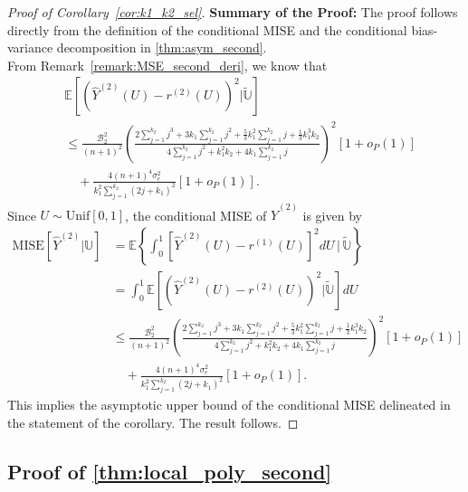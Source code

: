 \documentclass{uwstat572}
\theoremstyle{definition}
\renewcommand{\hat}{\widehat}
\renewcommand{\tilde}{\widetilde}
\theoremstyle{theorem}
\begin{document}
\begin{proof}[Proof of Corollary~\ref{cor:k1_k2_sel}]
{\bf Summary of the Proof:} The proof follows directly from the definition of the conditional MISE and the conditional bias-variance decomposition in \autoref{thm:asym_second}.\\

From Remark~\ref{remark:MSE_second_deri}, we know that
\begin{align*}
&\mathbb{E}\left[\left(\hat{Y}^{(2)}(U) - r^{(2)}(U)\right)^2 \Big| \tilde{\mathbb{U}}\right] \\
&\leq \frac{\mathcal{B}_2^2}{(n+1)^2}  \left(\frac{2\sum_{j=1}^{k_2} j^3 + 3k_1 \sum_{j=1}^{k_2} j^2 + \frac{5}{3} k_1^2 \sum_{j=1}^{k_2}j + \frac{1}{3} k_1^3k_2}{4 \sum_{j=1}^{k_2}j^2 + k_1^2k_2 + 4k_1\sum_{j=1}^{k_2} j} \right)^2 \left[1+o_P(1)\right]\\
&\quad + \frac{4(n+1)^4 \sigma_e^2}{k_1^2 \sum_{j=1}^{k_2} (2j+k_1)^2} \left[1+o_P(1)\right].
\end{align*}
Since $U\sim \mathrm{Unif}[0,1]$, the conditional MISE of $\hat{Y}^{(2)}$ is given by
\begin{align*}
\mathrm{MISE}\left[\hat{Y}^{(2)} \big|\mathbb{U}\right] &= \mathbb{E}\left\{\int_0^1 \left[\hat{Y}^{(2)}(U) - r^{(1)}(U)\right]^2 dU \,\Big|\, \tilde{\mathbb{U}} \right\}\\
&= \int_0^1 \mathbb{E}\left[\left(\hat{Y}^{(2)}(U) - r^{(2)}(U)\right)^2 \Big| \tilde{\mathbb{U}}\right] dU\\
&\leq \frac{\mathcal{B}_2^2}{(n+1)^2}  \left(\frac{2\sum_{j=1}^{k_2} j^3 + 3k_1 \sum_{j=1}^{k_2} j^2 + \frac{5}{3} k_1^2 \sum_{j=1}^{k_2}j + \frac{1}{3} k_1^3k_2}{4 \sum_{j=1}^{k_2}j^2 + k_1^2k_2 + 4k_1\sum_{j=1}^{k_2} j} \right)^2 \left[1+o_P(1)\right]\\
&\quad + \frac{4(n+1)^4 \sigma_e^2}{k_1^2 \sum_{j=1}^{k_2} (2j+k_1)^2} \left[1+o_P(1)\right]. 
\end{align*}
This implies the asymptotic upper bound of the conditional MISE delineated in the statement of the corollary. The result follows.
\end{proof}


\subsection{Proof of \autoref{thm:local_poly_second}}
\label{App:proof_thm7}
\end{document}

